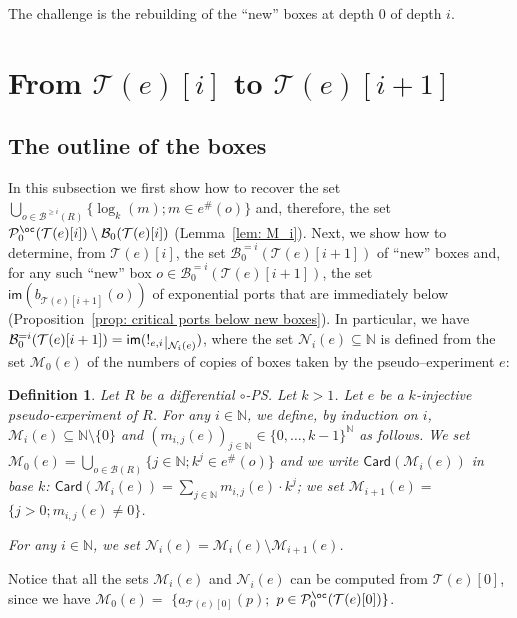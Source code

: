 \documentclass{article}
\theoremstyle{plain}
\newtheorem{definition}{Definition}
\newcommand{\Nat}{\ensuremath{\mathbb{N}}}
\newcommand{\taylor}[2]{\mathcal{T}(#1)[#2]}
\def\restriction#1#2{\mathchoice
              {\setbox1\hbox{${\displaystyle #1}_{\scriptstyle #2}$}
              \restrictionaux{#1}{#2}}
              {\setbox1\hbox{${\textstyle #1}_{\scriptstyle #2}$}
              \restrictionaux{#1}{#2}}
              {\setbox1\hbox{${\scriptstyle #1}_{\scriptscriptstyle #2}$}
              \restrictionaux{#1}{#2}}
              {\setbox1\hbox{${\scriptscriptstyle #1}_{\scriptscriptstyle #2}$}
              \restrictionaux{#1}{#2}}}
\def\restrictionaux#1#2{{#1\,\smash{\vrule height .8\ht1 depth .85\dp1}}_{\,#2}}
\newcommand{\im}[1]{\textsf{im}(#1)}
\newcommand{\cod}{\oc}
\newcommand{\arity}[1]{{\textit{a}}_{#1}}
\newcommand{\Card}[1]{\textsf{Card}\left( #1 \right)}
\newcommand{\portsatzerooftype}[2]{\mathcal{P}_0^{#1}(#2)}
\newcommand{\boxes}[1]{\mathcal{B}(#1)}
\newcommand{\boxesatzero}[1]{\mathcal{B}_{0}(#1)}
\newcommand{\exactboxesatzero}[2]{\mathcal{B}_{0}^{=#2}(#1)}
\newcommand{\boxesgeq}[2]{\mathcal{B}^{\geq #2}(#1)}
\begin{document}
The challenge is the rebuilding of the ``new'' boxes at depth $0$ of depth $i$.

\section{From $\taylor{e}{i}$ to $\taylor{e}{i+1}$}\label{section: one step}

\subsection{The outline of the boxes}\label{subsection: outline}

In this subsection we first show how to recover the set $\bigcup_{o \in \boxesgeq{R}{i}} \{ \log_k(m) ; m \in e^\#(o) \}$ and, therefore, the set $\portsatzerooftype{\cod}{\taylor{e}{i}} \setminus \boxesatzero{\taylor{e}{i}}$ (Lemma~\ref{lem: M_i}). Next, we show how to determine, from $\taylor{e}{i}$, the set $\exactboxesatzero{\taylor{e}{i+1}}{i}$ of ``new'' boxes and, for any such ``new'' box $o \in \exactboxesatzero{\taylor{e}{i+1}}{i}$, the set $\im{b_{\taylor{e}{i+1}}(o)}$ of exponential ports that are immediately below (Proposition~\ref{prop: critical ports below new boxes}). In particular, we have $\exactboxesatzero{\taylor{e}{i+1}}{i} = \im{\restriction{!_{e, i}}{\mathcal{N}_i(e)}}$, where the set $\mathcal{N}_i(e) \subseteq \Nat$ is defined from the set $\mathcal{M}_0(e)$ of the numbers of copies of boxes taken by the pseudo--experiment $e$:






\begin{definition}\label{defin: the algorithm (b)}
Let $R$ be a differential $\circ$-PS. Let $k > 1$. Let $e$ be a $k$-injective pseudo-experiment of $R$. For any $i \in \Nat$, we define, by induction on $i$, $\mathcal{M}_i(e) \subseteq \Nat \setminus \{ 0 \}$ and $(m_{i, j}(e))_{j \in \Nat} \in \{ 0, \ldots, k-1 \}^\Nat$ as follows. 
We set $\mathcal{M}_0(e) = \bigcup_{o \in \boxes{R}{}} \{ j \in \Nat; k^j \in e^\#(o) \}$ and we write $\Card{\mathcal{M}_i(e)}$ in base $k$: $\Card{\mathcal{M}_i(e)} = \sum_{j \in \Nat} m_{i, j}(e) \cdot k^j$; we set $\mathcal{M}_{i+1}(e) =$ $\{ j > 0 ; m_{i, j}(e) \not= 0 \}$.


For any $i \in \Nat$, we set $\mathcal{N}_i(e) =  \mathcal{M}_i(e) \setminus \mathcal{M}_{i+1}(e)$.
\end{definition}

Notice that all the sets $\mathcal{M}_i(e)$ and $\mathcal{N}_i(e)$ can be computed from $\taylor{e}{0}$, since
we have $\mathcal{M}_0(e) =$ $\{ \arity{\taylor{e}{0}}(p) ;$ $p \in \portsatzerooftype{\cod}{\taylor{e}{0}} \}$.
\end{document}
